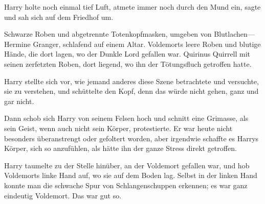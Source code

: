 Harry holte noch einmal tief Luft, atmete immer noch durch den Mund ein, sagte  und sah sich auf dem Friedhof um.





Schwarze Roben und abgetrennte Totenkopfmasken, umgeben von Blutlachen—
Hermine Granger, schlafend auf einem Altar.
Voldemorts leere Roben und blutige Hände, die dort lagen, wo der Dunkle Lord gefallen war.
Quirinus Quirrell mit seinen zerfetzten Roben, dort liegend, wo ihn der Tötungsfluch getroffen hatte.

Harry stellte sich vor, wie jemand anderes diese Szene betrachtete und versuchte, sie zu verstehen, und schüttelte den Kopf, denn das würde nicht gehen, ganz und gar nicht.

Dann schob sich Harry von seinem Felsen hoch und schnitt eine Grimasse, als sein Geist, wenn auch nicht sein Körper, protestierte. Er war heute nicht besonders überanstrengt oder gefoltert worden, aber irgendwie schaffte es Harrys Körper, sich so anzufühlen, als hätte ihn der ganze Stress direkt getroffen.

Harry taumelte zu der Stelle hinüber, an der Voldemort gefallen war, und hob Voldemorts linke Hand auf, wo sie auf dem Boden lag.
Selbst in der linken Hand konnte man die schwache Spur von Schlangenschuppen erkennen; es war ganz eindeutig Voldemort. Das war gut so.

